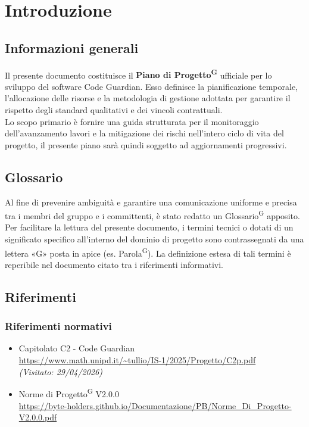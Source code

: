 \documentclass[a4paper, 11pt]{article}
\newcommand{\lastVisited}[3]{\textit{(Visitato: #1/#2/#3)}}
\begin{document}
\pagestyle{fancy}
\newpage
\tableofcontents
\newpage
\listoftables
\newpage
\listoffigures
\newpage

\section{Introduzione}

\subsection{Informazioni generali}
Il presente documento costituisce il \textbf{Piano di Progetto\textsuperscript{G}} ufficiale per lo sviluppo del software Code Guardian. Esso definisce la pianificazione temporale, l'allocazione delle risorse e la metodologia di gestione adottata per garantire il rispetto degli standard qualitativi e dei vincoli contrattuali. \\[0.5cm]
Lo scopo primario è fornire una guida strutturata per il monitoraggio dell'avanzamento lavori e la mitigazione dei rischi nell'intero ciclo di vita del progetto, il presente piano sarà quindi soggetto ad aggiornamenti progressivi.

\subsection{Glossario}
Al fine di prevenire ambiguità e garantire una comunicazione uniforme e precisa tra i membri del gruppo e i committenti, è stato redatto un Glossario\textsuperscript{G} apposito.
Per facilitare la lettura del presente documento, i termini tecnici o dotati di un significato specifico all'interno del dominio di progetto sono contrassegnati da una lettera «G» posta in apice (es. Parola\textsuperscript{G}).
La definizione estesa di tali termini è reperibile nel documento citato tra i riferimenti informativi.

\subsection{Riferimenti}
\subsubsection{Riferimenti normativi}
\begin{itemize}
  \item
  	Capitolato C2 - Code Guardian\\
  	\url{https://www.math.unipd.it/~tullio/IS-1/2025/Progetto/C2p.pdf}\\
  	\lastVisited{29}{04}{2026}
  \item 
  	Norme di Progetto\textsuperscript{G} V2.0.0\\
  	\url{https://byte-holders.github.io/Documentazione/PB/Norme_Di_Progetto-V2.0.0.pdf}
\end{itemize}
\end{document}
